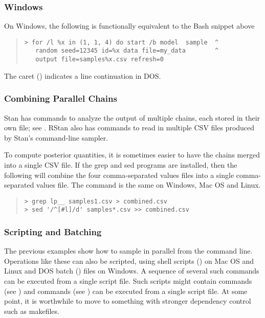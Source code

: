 \subsubsection{Windows}

On Windows, the following is functionally equivalent to the Bash
snippet above
%
\begin{quote}
\begin{Verbatim}[fontshape=sl]
> for /l %x in (1, 1, 4) do start /b model  sample  ^
   random seed=12345 id=%x data file=my_data        ^
   output file=samples%x.csv refresh=0
\end{Verbatim}
\end{quote}
%
The caret (\code{\textasciicircum}) indicates a line continuation in
DOS.

\subsubsection{Combining Parallel Chains}

Stan has commands to analyze the output of multiple chains, each
stored in their own file;  see .  RStan also
has commands to read in multiple CSV files produced by Stan's
command-line sampler.  

To compute posterior quantities, it is sometimes easier to have the
chains merged into a single CSV file.  If the grep and sed programs
are installed, then the following will combine the four
comma-separated values files into a single comma-separated values
file.  The command is the same on Windows, Mac OS and Linux.
%
\begin{quote}
\begin{Verbatim}[fontshape=sl]
> grep lp__ samples1.csv > combined.csv
> sed '/^[#l]/d' samples*.csv >> combined.csv 
\end{Verbatim}
\end{quote}

\subsubsection{Scripting and Batching}

The previous examples show how to sample in parallel from the command
line.  Operations like these can also be scripted, using shell scripts
() on Mac OS and Linux and DOS batch () files on
Windows.  A sequence of several such commands can be executed from a
single script file.  Such scripts might contain  commands
(see ) and  commands (see
) can be executed from a single script
file.  At some point, it is worthwhile to move to something with
stronger dependency control such as makefiles.


